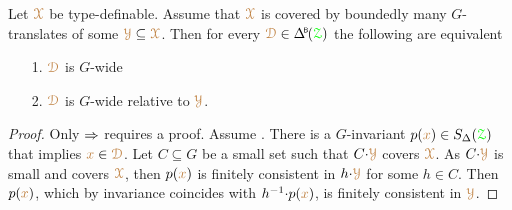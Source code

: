 \begin{proposition}\label{prop_HgenGgen}
  Let ${\color{brown}\EuScript X}$ be type-definable.
  Assume that ${\color{brown}\EuScript X}$ is covered by boundedly many $G$-translates of some ${\color{brown}\EuScript Y}\subseteq{\color{brown}\EuScript X}$.
  Then for every $\mrD\in\BDelta(\grZ)$ the following are equivalent
  \begin{itemize}
    \item [1.] ${\color{brown}\EuScript D}$ is $G$-wide
    \item [2.] ${\color{brown}\EuScript D}$ is $G$-wide relative to ${\color{brown}\EuScript Y}$.
  \end{itemize}\smallskip
\end{proposition}

\begin{proof}
  Only $\Rightarrow$ requires a proof.
  Assume .
  There is a $G$-invariant $p({\color{brown} x})\in S_\Delta({\color{green}\EuScript Z})$ that implies ${\color{brown} x}\in{\color{brown}\EuScript D}$.
  Let $C\subseteq G$ be a small set such that $C{\cdot}{\color{brown}\EuScript Y}$ covers ${\color{brown}\EuScript X}$.
  As $C{\cdot}{\color{brown}\EuScript Y}$ is small and covers ${\color{brown}\EuScript X}$, then $p({\color{brown} x})$ is finitely consistent in $h{\cdot}{\color{brown}\EuScript Y}$ for some $h\in C$.
  Then $p({\color{brown} x})$, which by invariance coincides with $h^{-1}{\cdot}p({\color{brown} x})$, is finitely consistent in ${\color{brown}\EuScript Y}$.
\end{proof}



